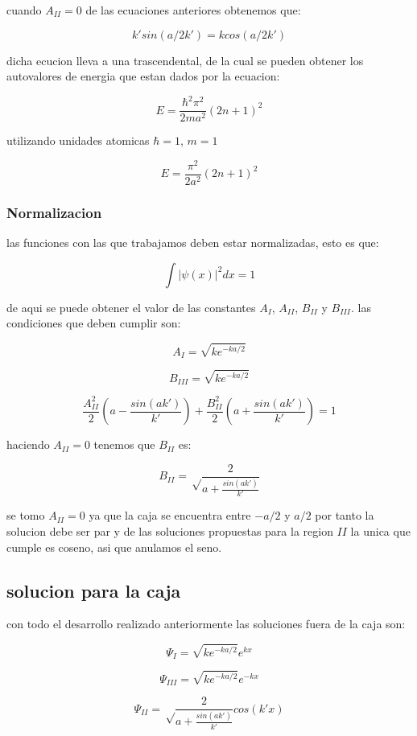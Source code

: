 \documentclass[11pt]{article}
\begin{document}
cuando \(A_{II}=0\) de las ecuaciones anteriores obtenemos que:

\[k'sin(a/2 k')=k cos(a/2 k')\]

dicha ecucion lleva a una trascendental, de la cual se pueden obtener
los autovalores de energia que estan dados por la ecuacion:

\[E=\frac{\hbar ^2 \pi ^2}{2ma^2}(2n+1)^2\]

utilizando unidades atomicas \(\hbar=1\), \(m=1\)

\[E=\frac{\pi ^2}{2a^2}(2n+1)^2\]

\hypertarget{normalizacion}{%
\subsubsection{Normalizacion}\label{normalizacion}}

las funciones con las que trabajamos deben estar normalizadas, esto es
que:

\[\int{|\psi (x)|^2dx}=1\]

de aqui se puede obtener el valor de las constantes \(A_{I}\),
\(A_{II}\), \(B_{II}\) y \(B_{III}\). las condiciones que deben cumplir
son:

\[A_I=\sqrt{ke^{-k a/2}}\]

\[B_{III}=\sqrt{ke^{-ka/2}}\]

\[\frac{A_{II}^2}{2}\left(a-\frac{sin(ak')}{k'}\right)+\frac{B_{II}^2}{2}\left(a+\frac{sin(ak')}{k'}\right)=1\]

haciendo \(A_{II}=0\) tenemos que \(B_{II}\) es:

\[B_{II}=\sqrt\frac{2}{a+\frac{sin(ak')}{k'}}\]

se tomo \(A_{II}=0\) ya que la caja se encuentra entre \(-a/2\) y
\(a/2\) por tanto la solucion debe ser par y de las soluciones
propuestas para la region \(II\) la unica que cumple es coseno, asi que
anulamos el seno.

\hypertarget{solucion-para-la-caja}{%
\subsection{solucion para la caja}\label{solucion-para-la-caja}}

con todo el desarrollo realizado anteriormente las soluciones fuera de
la caja son:

\[ \Psi _I=\sqrt{ke^{-k a/2}}e^{kx}\]

\[ \Psi _{III}=\sqrt{ke^{-ka/2}}e^{-kx}\]

\[ \Psi_{II}=\sqrt\frac{2}{a+\frac{sin(ak')}{k'}} cos(k'x)\]
\end{document}
